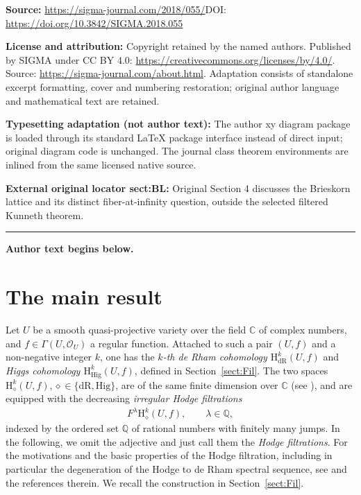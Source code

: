 \documentclass[11pt]{article}
\newcommand{\CC}{\mathbb{C}}
\newcommand{\QQ}{\mathbb{Q}}
\newcommand{\sO}{\mathscr{O}}
\newcommand{\dR}{\mathrm{dR}}
\newcommand{\Hig}{\mathrm{Hig}}
\newcommand{\coH}{\mathrm{H}}
\newcommand{\dRH}{\diamond}
\begin{document}
\noindent\textbf{Source:} \url{https://sigma-journal.com/2018/055/}\quad DOI: \url{https://doi.org/10.3842/SIGMA.2018.055}\par
\noindent\textbf{License and attribution:} Copyright retained by the named authors. Published by SIGMA under CC BY 4.0: \url{https://creativecommons.org/licenses/by/4.0/}. Source: \url{https://sigma-journal.com/about.html}. Adaptation consists of standalone excerpt formatting, cover and numbering restoration; original author language and mathematical text are retained.\par
\noindent\textbf{Typesetting adaptation (not author text):} The author xy diagram package is loaded through its standard LaTeX package interface instead of direct input; original diagram code is unchanged. The journal class theorem environments are inlined from the same licensed native source.\par
\noindent\textbf{External original locator sect:BL:} Original Section 4 discusses the Brieskorn lattice and its distinct fiber-at-infinity question, outside the selected filtered Kunneth theorem.\par
\medskip\hrule\medskip\noindent\textbf{Author text begins below.}\par
\setcounter{section}{0}
\setcounter{subsection}{0}
\setcounter{subsubsection}{0}
\setcounter{equation}{0}
\section{The main result}

Let $U$ be a smooth quasi-projective variety over the field $\CC$ of complex numbers, and $f\in\Gamma(U,\sO_U)$ a regular function. Attached to such a pair $(U,f)$ and a non-negative integer $k$, one has the
\textit{$k$-th de Rham cohomology $\coH_\dR^k(U,f)$} and \textit{Higgs cohomology $\coH_\Hig^k(U,f)$}, defined in Section~\ref{sect:Fil}. The two spaces $\coH_\dRH^k(U,f), \dRH\in\{\dR, \Hig\}$, are of the same finite dimension over $\CC$ (see \cite[Remark~1.3.3]{ESY}), and are equipped with the decreasing \textit{irregular Hodge filtrations}
\begin{gather*} F^\lambda \coH_\dRH^k(U,f), \qquad \lambda \in \QQ, \end{gather*}
indexed by the ordered set $\QQ$ of rational numbers with finitely many jumps. In the following, we omit the adjective and just call them the \textit{Hodge filtrations}. For the motivations and the basic properties of the Hodge filtration, including in particular the degeneration of the Hodge to de Rham spectral sequence, see \cite{ESY, KKP} and the references therein. We recall the construction in Section~\ref{sect:Fil}.
\end{document}
